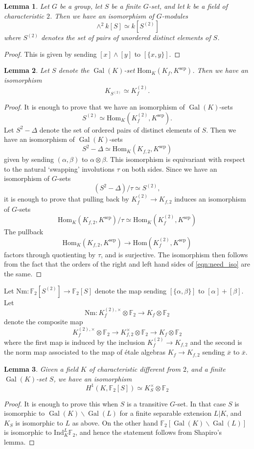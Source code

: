 \documentclass[11pt]{amsart}
\def\F{\mathbb F}
\theoremstyle{plain}
\newtheorem{lemma}{Lemma}
\theoremstyle{definition}
\DeclareMathOperator{\Gal}{Gal}
\newcommand{\Ind}{\mathrm{Ind}}
\newcommand{\sep}{\mathrm{sep}}
\newcommand{\Nm}{\mathrm{Nm}}
\newcommand{\Hom}{\mathrm{Hom}}
\begin{document}
\begin{lemma}
Let $G$ be a group, let $S$ be a finite $G$-set, and let $k$ be a field of characteristic $2$. Then we have an isomorphism of $G$-modules
\[
\wedge ^2 k[S]\simeq k[S^{(2)}]
\]
where $S^{(2)}$ denotes the set of pairs of unordered distinct elements of $S$.
\end{lemma}
\begin{proof}
This is given by sending $[x]\wedge [y]$ to $[\{ x,y\} ]$.
\end{proof}


\begin{lemma}
Let $S$ denote the $\Gal (K)$-set $\Hom _K (K_f ,K^{\sep })$. Then we have an isomorphism
\[
K_{S^{(2)}}\simeq K_f ^{(2)}.
\]
\end{lemma}
\begin{proof}
It is enough to prove that we have an isomorphism of $\Gal (K)$-sets
\[
S^{(2)}\simeq \Hom _K (K_f ^{(2)},K^{\sep }).
\]
Let $S^2 -\Delta $ denote the set of ordered pairs of distinct elements of $S$. Then we have an isomorphism of $\Gal (K)$-sets
\[
S^2 -\Delta \simeq \Hom _K (K_{f,2},K^{\sep })
\]
given by sending $(\alpha ,\beta )$ to $\alpha \otimes \beta $. This isomorphism is equivariant with respect to the natural `swapping' involutions $\tau $ on both sides. Since we have an isomorphism of $G$-sets 
\[
(S^2 -\Delta )/\tau \simeq S^{(2)},
\]
it is enough to prove that pulling back by $K_f ^{(2)}\to K_{f,2}$ induces an isomorphism of $G$-sets
\begin{equation}\label{eqn:need_iso}
\Hom _K (K_{f,2},K^{\sep })/\tau \simeq \Hom _K (K_f ^{(2)},K^{\sep })
\end{equation}
The pullback
\[
\Hom _K (K_{f,2},K^{\sep })\to \Hom (K_f ^{(2)},K^{\sep })
\]
factors through quotienting by $\tau $, and is surjective. The isomorphism then follows from the fact that the orders of the right and left hand sides of \eqref{eqn:need_iso} are the same.
\end{proof}
Let $\Nm :\F _2 [S^{(2)}]\to \F _2 [S]$ denote the map sending $[\{\alpha ,\beta \}] $ to $[\alpha ] +[\beta ]$. Let
\[
\Nm :K_f ^{(2),\times }\otimes \F _2 \to K_f \otimes \F _2 
\]
denote the composite map
\[
K_f ^{(2),\times }\otimes \F _2 \to K_{f,2}^\times \otimes \F _2 \to K_f \otimes \F _2
\]
where the first map is induced by the inclusion $K_f ^{(2)}\to K_{f,2}$ and the second is the norm map associated to the map of \'etale algebras $K_f \to K_{f,2}$ sending $\overline{x}$ to $\overline{x}$.

\begin{lemma}
Given a field $K$ of characteristic different from $2$, and a finite $\Gal (K)$-set $S$, we have an isomorphism
\[
H^1 (K,\F _2 [S])\simeq K_S ^\times \otimes \F _2 
\]
\end{lemma}
\begin{proof}
It is enough to prove this when $S$ is a transitive $G$-set. In that case $S$ is isomorphic to $\Gal (K) \backslash \Gal (L)$ for a finite separable extension $L|K$, and $K_S $ is isomorphic to $L$ as above. On the other hand $\F_ 2[\Gal (K)\backslash \Gal (L)]$ is isomorphic to $\Ind ^L _K \F _2 $, and hence the statement follows from Shapiro's lemma.
\end{proof}
\end{document}
